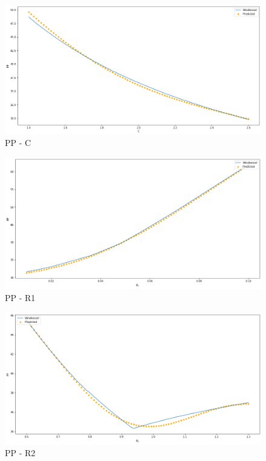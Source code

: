 \newpage
\begin{figure}[h]
    \centering
    \includegraphics[width=1\textwidth]{images/Training - temp/PP - C.png}
    \caption{PP - C}
\end{figure}


\newpage
\begin{figure}[h]
    \centering
    \includegraphics[width=1\textwidth]{images/Training - temp/PP - R1.png}
    \caption{PP - R1}
\end{figure}

\newpage
\begin{figure}[h]
    \centering
    \includegraphics[width=1\textwidth]{images/Training - temp/PP - R2.png}
    \caption{PP - R2}
\end{figure}


